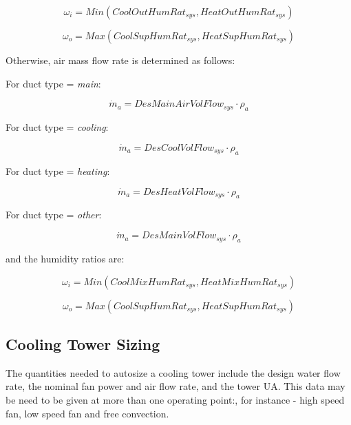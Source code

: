 \begin{equation}
{\omega_i} = Min\left( {CoolOutHumRa{t_{sys}},HeatOutHumRa{t_{sys}}} \right)
\end{equation}

\begin{equation}
  {\omega_o} = Max\left( {CoolSupHumRa{t_{sys}},HeatSupHumRa{t_{sys}}} \right)
\end{equation}

Otherwise, air mass flow rate is determined as follows:

For duct type = \emph{main}:

\begin{equation}
{\dot m_a} = DesMainAirVolFlo{w_{sys}} \cdot {\rho_a}
\end{equation}

For duct type = \emph{cooling}:

\begin{equation}
{\dot m_a} = DesCoolVolFlo{w_{sys}} \cdot {\rho_a}
\end{equation}

For duct type = \emph{heating}:

\begin{equation}
{\dot m_a} = DesHeatVolFlo{w_{sys}} \cdot {\rho_a}
\end{equation}

For duct type = \emph{other}:

\begin{equation}
{\dot m_a} = DesMainVolFlo{w_{sys}} \cdot {\rho_a}
\end{equation}

and the humidity ratios are:

\begin{equation}
{\omega_i} = Min\left( {CoolMixHumRa{t_{sys}},HeatMixHumRa{t_{sys}}} \right)
\end{equation}

\begin{equation}
  {\omega_o} = Max\left( {CoolSupHumRa{t_{sys}},HeatSupHumRa{t_{sys}}} \right)
\end{equation}

\subsection{Cooling Tower Sizing}\label{cooling-tower-sizing}

The quantities needed to autosize a cooling tower include the design water flow rate, the nominal fan power and air flow rate, and the tower UA. This data may be need to be given at more than one operating point:, for instance - high speed fan, low speed fan and free convection.

